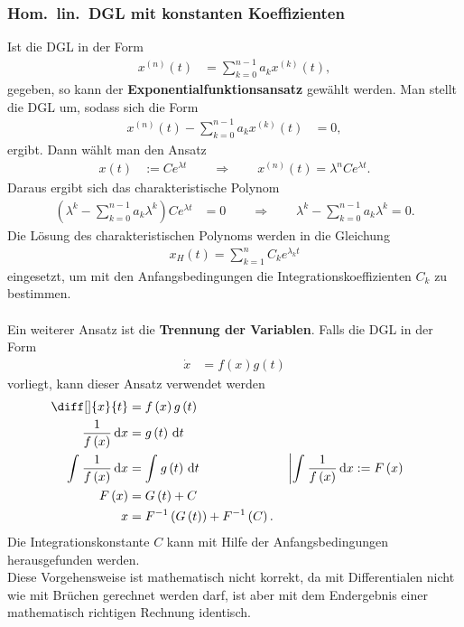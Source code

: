 \documentclass[a4paper,12pt]{article}
\newcommand{\td}{\,\text{d}}
\numberwithin{equation}{section}
\begin{document}
\subsubsection{Hom.\ lin.\ DGL mit konstanten Koeffizienten}
Ist die DGL in der Form
\begin{align} 
        x^{\left(n\right)}\left(t\right)&=\sum_{k=0}^{n-1}a_kx^{\left(k\right)}\left(t\right)
,\end{align} 
gegeben, so kann der \textbf{Exponentialfunktionsansatz} gewählt werden. Man stellt die DGL um, sodass sich die Form
\begin{align} 
        x^{\left(n\right)}\left(t\right)-\sum_{k=0}^{n-1}a_kx^{\left(k\right)}\left(t\right)&=0
,\end{align} 
ergibt. Dann wählt man den Ansatz 
\begin{align} 
        x\left(t\right)&:=Ce^{\lambda t}\qquad \Rightarrow \qquad x^{\left(n\right)}\left(t\right)=\lambda ^nCe^{\lambda t}
.\end{align} 
Daraus ergibt sich das charakteristische Polynom
\begin{align} 
        \left(\lambda ^k-\sum_{k=0}^{n-1}a_k\lambda ^k\right)Ce^{\lambda t}&=0\qquad \Rightarrow \qquad \lambda ^k-\sum_{k=0}^{n-1}a_k\lambda ^k=0
.\end{align} 
Die Lösung des charakteristischen Polynoms werden in die Gleichung
\begin{align} 
        x_H\left(t\right)=\sum_{k=1}^{n}C_ke^{\lambda _kt}
\end{align} 
eingesetzt, um mit den Anfangsbedingungen die Integrationskoeffizienten $C_k$ zu bestimmen.\\\\
Ein weiterer Ansatz ist die \textbf{Trennung der Variablen}. Falls die DGL in der Form
\begin{align} 
        \dot{x}&=f\left(x\right)g\left(t\right)
\end{align} 
vorliegt, kann dieser Ansatz verwendet werden
\begin{align}
        \diff[]{x}{t}&=f\left(x\right)g\left(t\right)\\
        \dfrac{1}{f\left(x\right)}\td x&=g\left(t\right)\td t\\
        \int_{}^{}\dfrac{1}{f\left(x\right)}\td x&=\int_{}^{}g\left(t\right)\td t&&\left|\int_{}^{}\dfrac{1}{f\left(x\right)}\td x:=F\left(x\right)\right.\\
        F\left(x\right)&=G\left(t\right)+C\\
        x&=F^{-1}\left(G\left(t\right)\right)+F^{-1}\left(C\right)
.\end{align} 
Die Integrationskonstante $C$ kann mit Hilfe der Anfangsbedingungen herausgefunden werden.\\\indent Diese Vorgehensweise ist mathematisch nicht korrekt, da mit Differentialen nicht wie mit Brüchen gerechnet werden darf, ist aber mit dem Endergebnis einer mathematisch richtigen Rechnung identisch.
\end{document}
